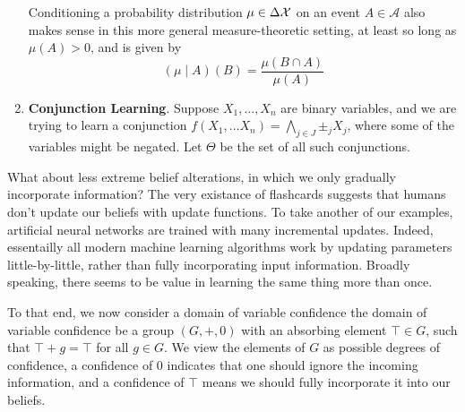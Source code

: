 \documentclass{article}
\begin{document}
\begin{enumerate}
{    

    Conditioning a probability distribution $\mu \in \Delta\mathcal X$ on an event $A \in \mathcal A$ also makes sense in this more general measure-theoretic setting, at least so long as $\mu(A) > 0$, and is given by
    $$
        (\mu \mid A) (B) = \frac{\mu(B \cap A)}{\mu(A)}
    $$
    }
    
    \item \textbf{Conjunction Learning}. 
    Suppose $X_1, \ldots, X_n$ are binary variables, and we are trying to learn a conjunction $f(X_1, \ldots X_n) = \bigwedge_{j \in J} {\pm_j} X_j$, where some of the variables might be negated.
    Let $\Theta$ be the set of all such conjunctions.
    


\end{enumerate}
%

What about less extreme belief alterations, in which we only gradually incorporate information? The very existance of flashcards suggests that humans don't update our beliefs with update functions.
To take another of our examples, artificial neural networks are trained with many incremental updates.
Indeed, essentailly all modern machine learning algorithms work by updating parameters little-by-little, rather than fully incorporating input information.
Broadly speaking, there seems to be value in learning the same thing more than once.


To that end, we now consider a domain of variable confidence
 the domain of variable confidence be a group $(G, +, 0)$ with an absorbing element $\top \in G$, such that $\top + g = \top$ for all $g \in G$.
We view the elements of $G$ as possible degrees of confidence, a confidence of $0$ indicates that one should ignore the incoming information, and a confidence of $\top$ means we should fully incorporate it into our beliefs.
\end{document}
